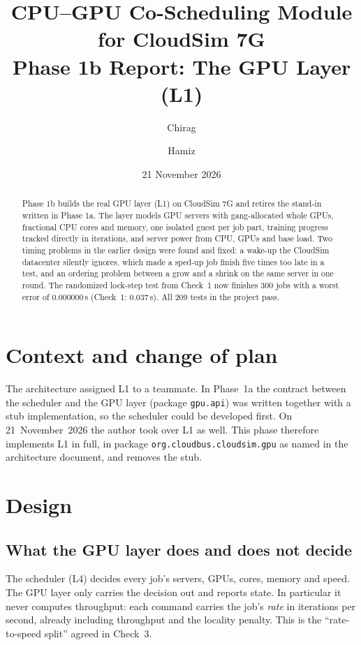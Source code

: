 \documentclass[11pt,a4paper]{article}
\title{CPU--GPU Co-Scheduling Module for CloudSim 7G\\[4pt]
\large Phase 1b Report: The GPU Layer (L1)}
\author{Chirag \and Hamiz}
\date{21 November 2026}
\newcommand{\code}[1]{\texttt{#1}}
\begin{document}
\maketitle

\begin{abstract}
Phase 1b builds the real GPU layer (L1) on CloudSim 7G and retires the stand-in written in Phase 1a.
The layer models GPU servers with gang-allocated whole GPUs, fractional CPU cores and memory, one
isolated guest per job part, training progress tracked directly in iterations, and server power from
CPU, GPUs and base load. Two timing problems in the earlier design were found and fixed: a wake-up
the CloudSim datacenter silently ignores, which made a sped-up job finish five times too late in a
test, and an ordering problem between a grow and a shrink on the same server in one round. The
randomized lock-step test from Check~1 now finishes 300 jobs with a worst error of 0.000000\,s
(Check~1: 0.037\,s). All 209 tests in the project pass.
\end{abstract}

\tableofcontents

\section{Context and change of plan}

The architecture assigned L1 to a teammate. In Phase~1a the contract between the scheduler and the
GPU layer (package \code{gpu.api}) was written together with a stub implementation, so the
scheduler could be developed first. On 21~November~2026 the author took over L1 as well. This
phase therefore implements L1 in full, in package \code{org.cloudbus.cloudsim.gpu} as named in the
architecture document, and removes the stub.

\section{Design}

\subsection{What the GPU layer does and does not decide}
The scheduler (L4) decides every job's servers, GPUs, cores, memory and speed. The GPU layer only
carries the decision out and reports state. In particular it never computes throughput: each
command carries the job's \emph{rate} in iterations per second, already including throughput and
the locality penalty. This is the ``rate-to-speed split'' agreed in Check~3.
\end{document}
